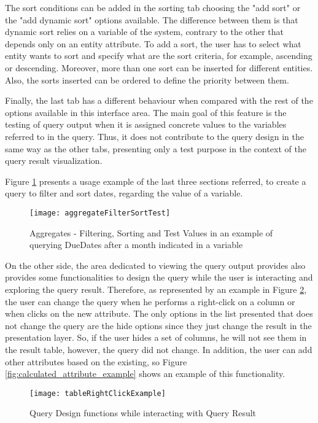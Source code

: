 The sort conditions can be added in the sorting tab choosing the "add sort" or the "add dynamic sort" options available. The difference between them is that dynamic sort relies on a variable of the system, contrary to the other that depends only on an entity attribute. To add a sort, the user has to select what entity wants to sort and specify what are the sort criteria, for example, ascending or descending.  Moreover, more than one sort can be inserted for different entities. Also, the sorts inserted can be ordered to define the priority between them.

Finally, the last tab has a different behaviour when compared with the rest of the options available in this interface area. The main goal of this feature is the testing of query output when it is assigned concrete values to the variables referred to in the query. Thus, it does not contribute to the query design in the same way as the other tabs, presenting only a test purpose in the context of the query result visualization.

Figure \ref{fig:aggregates_filter_sort_test} presents a usage example of the last three sections referred, to create a query to filter and sort dates, regarding the value of a variable.

\begin{figure}[htbp]
	\centering
	\texttt{[image: aggregateFilterSortTest]}
	\caption{Aggregates - Filtering, Sorting and Test Values in an example of querying DueDates after a month indicated in a variable}
	\label{fig:aggregates_filter_sort_test}
\end{figure}

On the other side, the area dedicated to viewing the query output provides also provides some functionalities to design the query while the user is interacting and exploring the query result. Therefore, as represented by an example in Figure \ref{fig:table_right_click_example}, the user can change the query when he performs a right-click on a column or when clicks on the new attribute. The only options in the list presented that does not change the query are the hide options since they just change the result in the presentation layer. So, if the user hides a set of columns, he will not see them in the result table, however, the query did not change. In addition, the user can add other attributes based on the existing, so Figure \ref{fig:calculated_attribute_example} shows an example of this functionality.

\begin{figure}[htbp]
	\centering
	\texttt{[image: tableRightClickExample]}
	\caption{Query Design functions while interacting with Query Result}
	\label{fig:table_right_click_example}
\end{figure}

